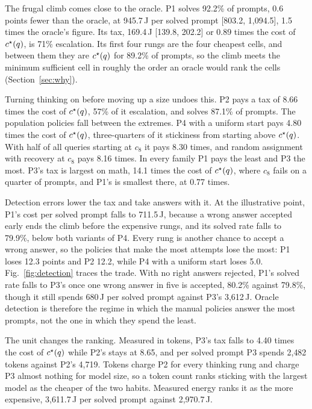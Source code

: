 The frugal climb comes close to the oracle. P1 solves 92.2\% of prompts,
0.6 points fewer than the oracle, at 945.7\,J per solved prompt [803.2,
1{,}094.5], 1.5 times the oracle's figure. Its tax, 169.4\,J [139.8, 202.2]
or 0.89 times the cost of $c^{\star}(q)$, is 71\% escalation. Its first four
rungs are the four cheapest cells, and between them they are $c^{\star}(q)$
for 89.2\% of prompts, so the climb meets the minimum sufficient cell in
roughly the order an oracle would rank the cells
(Section~\ref{sec:why}).

Turning thinking on before moving up a size undoes this. P2 pays a tax of
8.66 times the cost of $c^{\star}(q)$, 57\% of it escalation, and solves
87.1\% of prompts. The population policies fall between the
extremes. P4 with a uniform start pays 4.80 times the cost of
$c^{\star}(q)$, three-quarters of it stickiness from starting above
$c^{\star}(q)$. With half of all queries starting at $c_8$ it pays 8.30
times, and random assignment with recovery at $c_8$ pays 8.16 times. In
every family P1 pays the least and P3 the most. P3's tax is largest on
math, 14.1 times the cost of $c^{\star}(q)$, where $c_8$ fails on a quarter of
prompts, and P1's is smallest there, at 0.77 times.

Detection errors lower the tax and take answers with it. At the
illustrative point, P1's cost per solved prompt falls to 711.5\,J, because
a wrong answer accepted early ends the climb before the expensive rungs,
and its solved rate falls to 79.9\%, below both variants of P4. Every rung
is another chance to accept a wrong answer, so the policies that make the
most attempts lose the most: P1 loses 12.3 points and P2 12.2, while P4
with a uniform start loses 5.0. Fig.~\ref{fig:detection} traces the
trade. With no right answers rejected, P1's solved rate falls to P3's once
one wrong answer in five is accepted, 80.2\% against 79.8\%, though it
still spends 680\,J per solved prompt against P3's 3{,}612\,J. Oracle
detection is therefore the regime in which the manual policies answer the
most prompts, not the one in which they spend the least.

The unit changes the ranking. Measured in tokens, P3's tax falls to 4.40
times the cost of $c^{\star}(q)$ while P2's stays at 8.65, and per solved
prompt P3 spends 2{,}482 tokens against P2's 4{,}719. Tokens charge P2 for
every thinking rung and charge P3 almost nothing for model size, so a
token count ranks sticking with the largest model as the cheaper of the
two habits. Measured energy ranks it as the more expensive, 3{,}611.7\,J
per solved prompt against 2{,}970.7\,J.

